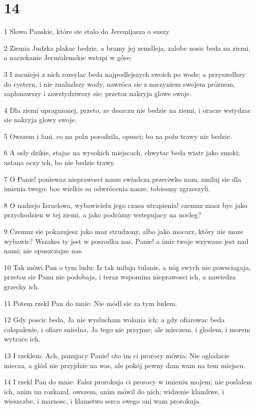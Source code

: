 \chapter{14}

\par 1 Slowo Panskie, które sie stalo do Jeremijasza o suszy.
\par 2 Ziemia Judzka plakac bedzie, a bramy jej zemdleja, zalobe nosic beda na ziemi, a narzekanie Jeruzalemskie wstapi w góre;
\par 3 I zacniejsi z nich rozsylac beda najpodlejszych swoich po wode; a przyszedlszy do cystern, i nie znalazlszy wody, nawróca sie z naczyniem swojem próznem, zaplonawszy i zawstydziwszy sie; przetoz nakryja glowe swoje.
\par 4 Dla ziemi upragnionej, przeto, ze deszczu nie bedzie na ziemi, i oracze wstydzac sie nakryja glowy swoje.
\par 5 Owszem i lani, co na polu porodzila, opusci; bo na polu trawy nie bedzie.
\par 6 A osly dzikie, stajac na wysokich miejscach, chwytac beda wiatr jako smoki; ustana oczy ich, bo nie bedzie trawy.
\par 7 O Panie! poniewaz nieprawosci nasze swiadcza przeciwko nam, zmiluj sie dla imienia twego; boc wielkie sa odwrócenia nasze, tobiesmy zgrzeszyli.
\par 8 O nadzejo Izraelowa, wybawicielu jego czasu utrapienia! czemuz masz byc jako przychodzien w tej ziemi, a jako podrózny wstepujacy na nocleg?
\par 9 Czemuz sie pokazujesz jako maz strudzony, albo jako mocarz, który nie moze wybawic? Wszakes ty jest w posrodku nas, Panie! a imie twoje wzywane jest nad nami; nie opuszczajze nas.
\par 10 Tak mówi Pan o tym ludu: Iz tak miluja tulanie, a nóg swych nie powsciagaja, przetoz sie Panu nie podobaja, i teraz wspomina nieprawosci ich, a nawiedza grzechy ich.
\par 11 Potem rzekl Pan do mnie: Nie módl sie za tym ludem.
\par 12 Gdy poscic beda, Ja nie wyslucham wolania ich; a gdy ofiarowac beda calopalenie, i ofiare sniedna, Ja tego nie przyjme; ale mieczem, i glodem, i morem wytrace ich.
\par 13 I rzeklem: Ach, panujacy Panie! oto im ci prorocy mówia: Nie ogladacie miecza, a glód nie przyjdzie na was, ale pokój pewny dam wam na tem miejscu.
\par 14 I rzekl Pan do mnie: Falsz prorokuja ci prorocy w imieniu mojem; nie poslalem ich, anim im rozkazal, owszem, anim mówil do nich; widzenie klamliwe, i wieszczbe, i marnosc, i klamstwo serca swego oni wam prorokuja.
